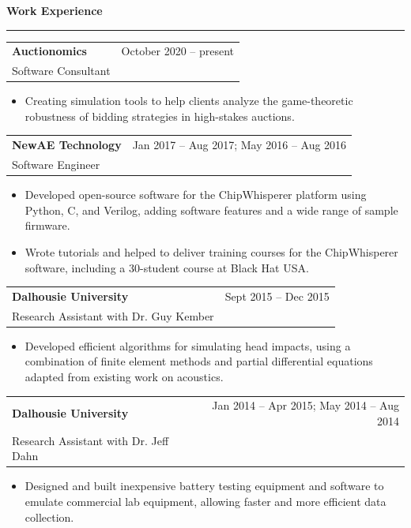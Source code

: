 \documentclass{article}
\newcommand{\heading}[1]
{
	\vspace{3pt}
	{\bf #1} 
	\vspace{-6pt}
	
	\rule{\linewidth}{0.4pt}
}
\begin{document}
\clearpage
\heading{Work Experience}
\begin{center}
	\begin{tabularx}{\textwidth}{Xr}
		\textbf{Auctionomics}		& October 2020 -- present \\
		Software Consultant
	\end{tabularx}
	\end{center}
	\begin{itemize}
		\item Creating simulation tools to help clients analyze the game-theoretic robustness of bidding strategies in high-stakes auctions.
	\end{itemize}

\begin{center}
\begin{tabularx}{\textwidth}{Xr}
	\textbf{NewAE Technology}		& Jan 2017 -- Aug 2017; May 2016 -- Aug 2016 \\
	Software Engineer
\end{tabularx}
\end{center}
\begin{itemize}
	\item Developed open-source software for the ChipWhisperer platform using Python, C, and Verilog, adding software features and a wide range of sample firmware.
	\item Wrote tutorials and helped to deliver training courses for the ChipWhisperer software, including a 30-student course at Black Hat USA.
\end{itemize}

\begin{center}
\begin{tabularx}{\textwidth}{Xr}
	\textbf{Dalhousie University}	& Sept 2015 -- Dec 2015 \\
	Research Assistant with Dr. Guy Kember
\end{tabularx}
\end{center}
\begin{itemize}
	\item Developed efficient algorithms for simulating head impacts, using a combination of finite element methods and partial differential equations adapted from existing work on acoustics.
\end{itemize}

\begin{center}
\begin{tabularx}{\textwidth}{Xr}
	\textbf{Dalhousie University}	& 
	Jan 2014 -- Apr 2015; May 2014 -- Aug 2014 \\
	Research Assistant with Dr. Jeff Dahn
\end{tabularx}
\end{center}
\begin{itemize}
	\item Designed and built inexpensive battery testing equipment and software to emulate commercial lab equipment, allowing faster and more efficient data collection.
\end{itemize}
\end{document}
